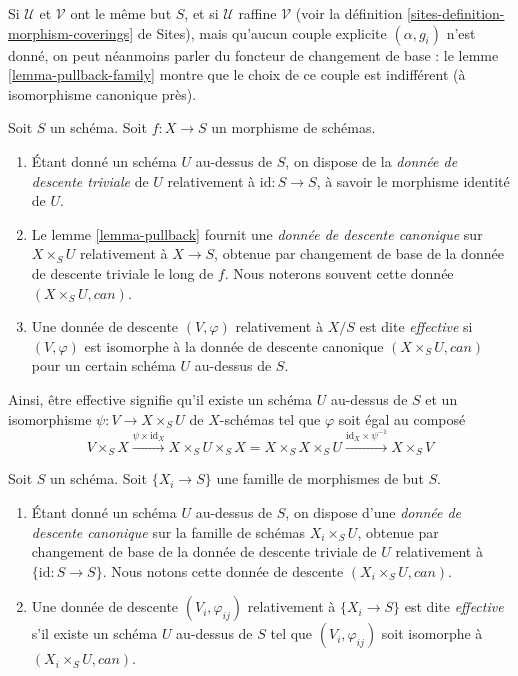 \noindent
Si $\mathcal{U}$ et $\mathcal{V}$ ont le même but $S$, et si
$\mathcal{U}$ raffine $\mathcal{V}$ (voir la
définition \ref{sites-definition-morphism-coverings} de Sites), mais qu'aucun
couple explicite $(\alpha, g_i)$ n'est donné, on peut néanmoins parler du
foncteur de changement de base : le
lemme \ref{lemma-pullback-family} montre que le choix de ce couple est
indifférent (à isomorphisme canonique près).


\begin{definition}
\label{definition-effective}
Soit $S$ un schéma.
Soit $f : X \to S$ un morphisme de schémas.
\begin{enumerate}
\item Étant donné un schéma $U$ au-dessus de $S$, on dispose de la
{\it donnée de descente triviale} de $U$ relativement à
$\text{id} : S \to S$, à savoir le morphisme identité de $U$.
\item Le lemme \ref{lemma-pullback} fournit une
{\it donnée de descente canonique} sur $X \times_S U$ relativement à
$X \to S$, obtenue par changement de base de la donnée de descente triviale
le long de $f$. Nous noterons souvent cette donnée
$(X \times_S U, can)$.
\item Une donnée de descente $(V, \varphi)$ relativement à $X/S$ est dite
{\it effective} si $(V, \varphi)$ est isomorphe à la donnée de descente
canonique $(X \times_S U, can)$ pour un certain schéma $U$ au-dessus de $S$.
\end{enumerate}
\end{definition}

\noindent
Ainsi, être effective signifie qu'il existe un schéma $U$ au-dessus de $S$
et un isomorphisme $\psi : V \to X \times_S U$ de $X$-schémas tel que
$\varphi$ soit égal au composé
$$
V \times_S X \xrightarrow{\psi \times \text{id}_X}
X \times_S U \times_S X =
X \times_S X \times_S U
\xrightarrow{\text{id}_X \times \psi^{-1}}
X \times_S V
$$

\begin{definition}
\label{definition-effective-family}
Soit $S$ un schéma.
Soit $\{X_i \to S\}$ une famille de morphismes de but $S$.
\begin{enumerate}
\item Étant donné un schéma $U$ au-dessus de $S$, on dispose d'une
{\it donnée de descente canonique} sur la famille de schémas
$X_i \times_S U$, obtenue par changement de base de la donnée de descente
triviale de $U$ relativement à $\{\text{id} : S \to S\}$.
Nous notons cette donnée de descente $(X_i \times_S U, can)$.
\item Une donnée de descente $(V_i, \varphi_{ij})$ relativement à
$\{X_i \to S\}$ est dite {\it effective} s'il existe un schéma $U$ au-dessus
de $S$ tel que $(V_i, \varphi_{ij})$ soit isomorphe à
$(X_i \times_S U, can)$.
\end{enumerate}
\end{definition}












